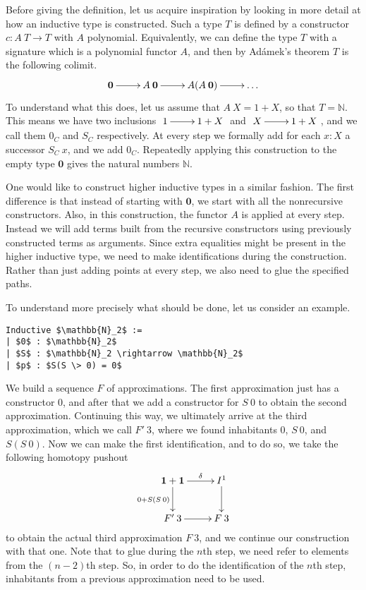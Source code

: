\documentclass[a4paper,UKenglish]{lipics-v2016}
\newcommand{\zero}[0]{\textbf{0}}
\newcommand{\one}[0]{\textbf{1}}
\begin{document}
Before giving the definition, let us acquire inspiration by looking in more detail at how an inductive type is constructed.
Such a type $T$ is defined by a constructor $c : A \> T \rightarrow T$ with $A$ polynomial.
Equivalently, we can define the type $T$ with a signature which is a polynomial functor $A$, and then by Ad\'amek's theorem $T$ is the following colimit.
\[
\xymatrix
{
        \zero \ar[r] & A \> \zero  \ar[r] & A(A \> \zero) \ar[r] & \ldots
}
\]
To understand what this does, let us assume that $A \> X = 1 + X$, so that $T = \mathbb{N}$.
This means we have two inclusions  $\xymatrix{1 \ar[r] & 1+X}$ and  $\xymatrix{X \ar[r] & 1+X}$, and we call them $0_C$ and $S_C$ respectively.
At every step we formally add for each $x : X$ a successor $S_C \> x$, and we add $0_C$.
Repeatedly applying this construction to the empty type $\zero$ gives the natural numbers $\mathbb{N}$.

One would like to construct higher inductive types in a similar fashion.
The first difference is that instead of starting with $\zero$, we start with all the nonrecursive constructors.
Also, in this construction, the functor $A$ is applied at every step.
Instead we will add terms built from the recursive constructors using previously constructed terms as arguments.
Since extra equalities might be present in the higher inductive type, we need to make identifications during the construction.
Rather than just adding points at every step, we also need to glue the specified paths.

To understand more precisely what should be done, let us consider an example.
\lstset{language=Coq}
\begin{lstlisting}
Inductive $\mathbb{N}_2$ :=
| $0$ : $\mathbb{N}_2$
| $S$ : $\mathbb{N}_2 \rightarrow \mathbb{N}_2$
| $p$ : $S(S \> 0) = 0$
\end{lstlisting}
We build a sequence $F$ of approximations.
The first approximation just has a constructor $0$, and after that we add a constructor for $S \> 0$ to obtain the second approximation.
Continuing this way, we ultimately arrive at the third approximation, which we call $F' \> 3$, where we found inhabitants $0$, $S \> 0$, and $S(S \> 0)$.
Now we can make the first identification, and to do so, we take the following homotopy pushout
\[
\xymatrix
{
        \one + \one \ar[d]_{0 + S(S \> 0)} \ar[r]^-{\delta} & I^1 \ar[d]\\
        F' \> 3\ar[r] & F \> 3
}
\]
to obtain the actual third approximation $F \> 3$, and we continue our construction with that one.
Note that to glue during the $n$th step, we need refer to elements from the $(n-2)$th step.
So, in order to do the identification of the $n$th step, inhabitants from a previous approximation need to be used.
\end{document}
